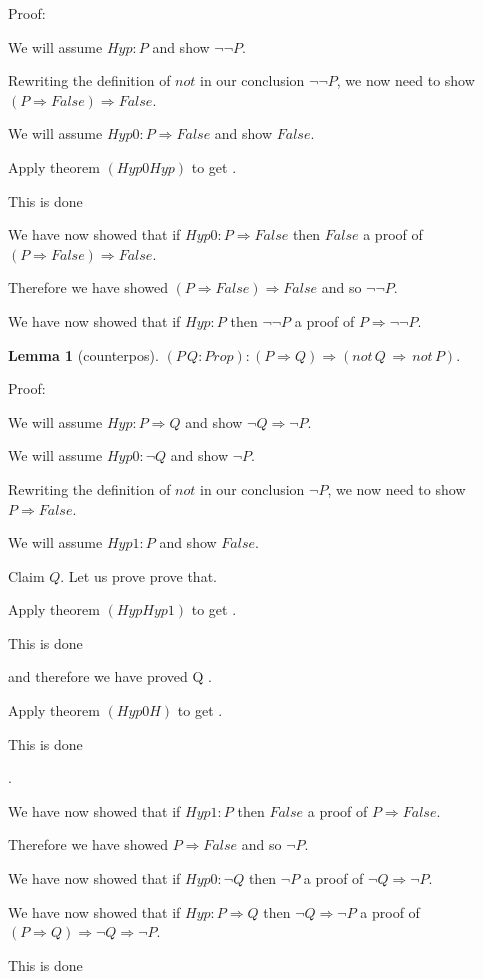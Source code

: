 \documentclass[11pt, oneside]{article}
\newtheorem{Lemma}{Lemma}
\begin{document}
 Proof: \begin{subproof}We will assume $Hyp : P $ and show $¬ ¬ P $.\begin{subproof}Rewriting the definition of $not$ in our conclusion $¬ ¬ P $, we now need to show $(P \Rightarrow False) \Rightarrow False $.\begin{subproof}We will assume $Hyp0 : P \Rightarrow False $ and show $False $.\begin{subproof}Apply theorem $(Hyp0 Hyp)$ to get $ $.\begin{subproof}This is done\end{subproof}\end{subproof} We have now showed that if $Hyp0 : P \Rightarrow False $ then $False $ a proof of $(P \Rightarrow False) \Rightarrow False $.\end{subproof} Therefore we have showed $(P \Rightarrow False) \Rightarrow False $ and so $¬ ¬ P $.\end{subproof} We have now showed that if $Hyp : P $ then $¬ ¬ P $ a proof of $P \Rightarrow ¬ ¬ P $.\end{subproof}\begin{Lemma}[counterpos] 
$(P\,Q:Prop):(P\Rightarrow Q)\Rightarrow (not\,Q\,\Rightarrow \,not\,P).$
 \end{Lemma}


 Proof: \begin{subproof}We will assume $Hyp : P \Rightarrow Q $ and show $¬ Q \Rightarrow ¬ P $.\begin{subproof}We will assume $Hyp0 : ¬ Q $ and show $¬ P $.\begin{subproof}Rewriting the definition of $not$ in our conclusion $¬ P $, we now need to show $P \Rightarrow False $.\begin{subproof}We will assume $Hyp1 : P $ and show $False $.\begin{subproof}Claim $Q $. Let us prove prove that. 

 \begin{subproof}Apply theorem $(Hyp Hyp1)$ to get $ $.\begin{subproof}This is done\end{subproof}\end{subproof} and therefore we have proved Q .\begin{subproof}Apply theorem $(Hyp0 H)$ to get $ $.\begin{subproof}This is done\end{subproof}\end{subproof}.\end{subproof} We have now showed that if $Hyp1 : P $ then $False $ a proof of $P \Rightarrow False $.\end{subproof} Therefore we have showed $P \Rightarrow False $ and so $¬ P $.\end{subproof} We have now showed that if $Hyp0 : ¬ Q $ then $¬ P $ a proof of $¬ Q \Rightarrow ¬ P $.\end{subproof} We have now showed that if $Hyp : P \Rightarrow Q $ then $¬ Q \Rightarrow ¬ P $ a proof of $(P \Rightarrow Q) \Rightarrow ¬ Q \Rightarrow ¬ P $.\end{subproof}This is done
\end{document}
